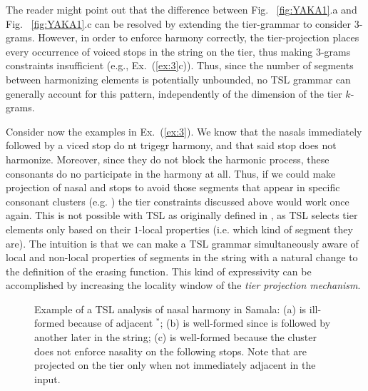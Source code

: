 The reader might point out that the difference between Fig.~ \ref{fig:YAKA1}.a and Fig.~ \ref{fig:YAKA1}.c can be resolved by extending the tier-grammar to consider $3$-grams.
However, in order to enforce harmony correctly, the tier-projection places every occurrence of voiced stops in the string on the tier, thus making $3$-grams constraints insufficient (e.g., Ex.~(\ref{ex:3}c)).
Thus, since the number of segments between harmonizing elements is potentially unbounded, no TSL grammar can generally account for this pattern, independently of the dimension of the tier $k$-grams.

Consider now the examples in Ex.~(\ref{ex:3}). 
We know that the nasals immediately followed by a viced stop do nt trigegr harmony, and that said stop does not harmonize. 
Moreover, since they do not block the harmonic process, these consonants do no participate in the harmony at all.
Thus, if we could make projection of nasal and stops to avoid  those segments that appear in specific consonant clusters (e.g. \textipa{[nd]}) the tier constraints discussed above would work once again.
This is not possible with TSL as originally defined in \cite{HeinzRawalTanner}, as TSL selects tier elements only based on their $1$-local properties (i.e. which kind of segment they are). %
The intuition is that we can make a TSL grammar  simultaneously aware of local and non-local properties of segments in the string with a natural change to the definition of the erasing function.
This kind of expressivity can be accomplished by increasing the locality window of the \emph{tier projection mechanism}. 

\begin{figure}[]
\begin{center}
    
        \end{center}
        \caption{Example of a TSL analysis of nasal harmony in Samala: (a) is ill-formed because of adjacent $^*$\textipa{[nd]}; (b) is well-formed since  \textipa{[n]} is followed by another  \textipa{[n]} later in the string; (c) is well-formed because the \textipa{[nd]} cluster does not enforce nasality on the following stops.  Note that \textipa{[n,d]} are projected on the tier only when not immediately adjacent in the input. }
        \label{fig:YAKA2}
        \end{figure}


